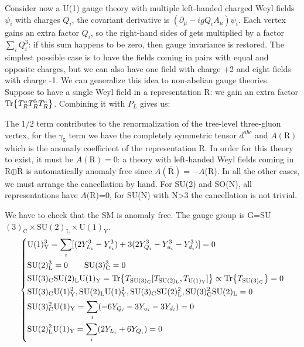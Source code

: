 \documentclass[../main.tex]{subfiles}
\begin{document}
Consider now a U(1) gauge theory with multiple left-handed charged Weyl fields $\psi_i$ with charges $Q_i$, the covariant derivative is $(\partial_\mu-igQ_iA_\mu)\psi_i$. Each vertex gains an extra factor $Q_i$, so the right-hand sides of  gets multiplied by a factor $\sum_i Q_i^3$: if this sum happens to be zero, then gauge invariance is restored. The simplest possible case is to have the fields coming in pairs with equal and opposite charges, but we can also have one field with charge +2 and eight fields with charge -1.
We can generalize this idea to non-abelian gauge theories. Suppose to have a single Weyl field in a representation R: we gain an extra factor $\Tr{T_R^aT_R^bT_R^c}$. Combining it with $P_L$ gives us:
\begin{center}
\end{center}
The $1/2$ term contributes to the renormalization of the tree-level three-gluon vertex, for the $\gamma_5$ term we have the completely symmetric tensor $d^{abc}$ and $A(\text{R})$ which is the anomaly coefficient of the representation R. In order for this theory to exist, it must be $A(\text{R})=0$: a theory with left-handed Weyl fields coming in R$\oplus\overline{\text{R}}$ is automatically anomaly free since $A(\overline{\text{R}})=-A$(R). In all the other cases, we must arrange the cancellation by hand. For SU(2) and SO(N), all representations have $A($R)=0, for SU(N) with N>3 the cancellation is not trivial.

We have to check that the SM is anomaly free. The gauge group is G=SU$(3)_{\text{C}}\times$SU$(2)_{\text{L}}\times$U$(1)_{\text{Y}}$.
\[
\left\{
\begin{aligned}
&\text{U}(1)_{\text{Y}}^3=\sum_i[(2Y_{L_i}^3-Y_{e_i}^3)+3(2Y_{Q_i}^3-Y_{u_i}^3-Y_{d_i}^3)]=0\\
&\text{SU}(2)_{\text{L}}^3=0 \qquad \text{SU}(3)_{\text{C}}^3=0\\
&\text{SU}(3)_{\text{C}}\text{SU}(2)_{\text{L}}\text{U}(1)_{\text{Y}}=\Tr{T_{\text{SU}(3)_{\text{C}}}[T_{\text{SU}(2)_{\text{L}}},T_{\text{U}(1)_{\text{Y}}}]}\propto\Tr{T_{\text{SU}(3)_{\text{C}}}}=0\\
&\text{SU}(3)_{\text{C}}\text{U}(1)_{\text{Y}}^2, \text{SU}(2)_{\text{L}}\text{U}(1)_{\text{Y}}^2, \text{SU}(3)_{\text{C}}\text{SU}(2)_{\text{L}}^2, \text{SU}(3)_{\text{C}}^2\text{SU}(2)_{\text{L}}=0\\
&\text{SU}(3)_{\text{C}}^2\text{U}(1)_{\text{Y}}=\sum_i(-6Y_{Q_i}-3Y_{u_i}-3Y_{d_i})=0\\
&\text{SU}(2)_{\text{L}}^2\text{U}(1)_{\text{Y}}=\sum_i(2Y_{L_i}+6Y_{Q_i})=0
\end{aligned}
\right.
\]
\end{document}
